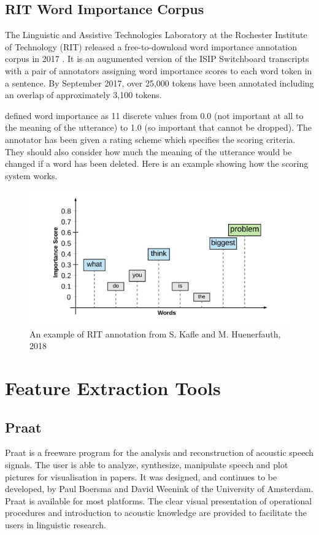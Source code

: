 \subsection{RIT Word Importance Corpus}
The Linguistic and Assistive Technologies Laboratory at the Rochester Institute of Technology (RIT) released a free-to-download word importance annotation corpus in 2017  \citep{Kafle2018}. It is an augumented version of the ISIP Switchboard transcripts with a pair of annotators assigning word importance scores to each word token in a sentence. By September 2017, over 25,000 tokens have been annotated including an overlap of approximately 3,100 tokens. 

\citet{Kafle2018} defined word importance as 11 discrete values from 0.0 (not important
at all to the meaning of the utterance) to 1.0 (so important that cannot be dropped). The annotator has been given a rating scheme which specifies the scoring criteria. They should also consider how much the meaning of the utterance would be changed if a word has been deleted. Here is an example showing how the scoring system works.

\begin{figure}[ht]
	\includegraphics[width=15cm]{figures/word.png}
	\caption{An example of RIT annotation from S. Kafle and M. Huenerfauth, 2018}
	\label{fig:word}
\end{figure}

\section{Feature Extraction Tools} 

\subsection{ Praat}
Praat \citep{PaulBoersma&DavidWeenink2018} is a freeware program for the analysis and reconstruction of acoustic speech signals. The user is able to analyze, synthesize, manipulate speech and plot pictures for visualisation in papers. It was designed, and continues to be developed, by Paul Boersma and David Weenink of the University of Amsterdam. Praat is available for most platforms. The clear visual presentation of operational procedures and introduction to acoustic knowledge are provided to facilitate the users in linguistic research.

